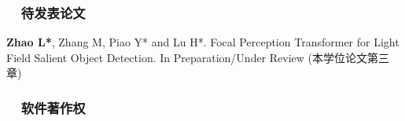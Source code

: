 
\begin{publications}


\subsubsection*{\textbf{~~待发表论文}}
\vspace{-10pt}
\begin{enumerate}[label={[\arabic*]}]
	
	
	\item
	\textbf{Zhao L*}, Zhang M, Piao Y* and Lu H*.
	Focal Perception Transformer for Light Field Salient Object Detection.
	In Preparation/Under Review
	(本学位论文第三章)
\end{enumerate}


\subsubsection*{\textbf{~~软件著作权}}
\vspace{-10pt}
\begin{enumerate}[label={[\arabic*]}]
	

\end{enumerate}
\end{publications}
